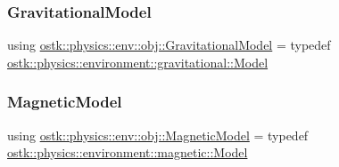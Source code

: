 \subsubsection{\texorpdfstring{Gravitational\+Model}{GravitationalModel}}
{\footnotesize\ttfamily using \hyperlink{namespaceostk_1_1physics_1_1env_1_1obj_a50c0bc72e8880f2fa2a910a81e050c97}{ostk\+::physics\+::env\+::obj\+::\+Gravitational\+Model} = typedef \hyperlink{classostk_1_1physics_1_1environment_1_1gravitational_1_1_model}{ostk\+::physics\+::environment\+::gravitational\+::\+Model}}

\mbox{\label{namespaceostk_1_1physics_1_1env_1_1obj_a11552c1290e2f6b4693ea00c2df2c80d}} 
\subsubsection{\texorpdfstring{Magnetic\+Model}{MagneticModel}}
{\footnotesize\ttfamily using \hyperlink{namespaceostk_1_1physics_1_1env_1_1obj_a11552c1290e2f6b4693ea00c2df2c80d}{ostk\+::physics\+::env\+::obj\+::\+Magnetic\+Model} = typedef \hyperlink{classostk_1_1physics_1_1environment_1_1magnetic_1_1_model}{ostk\+::physics\+::environment\+::magnetic\+::\+Model}}

